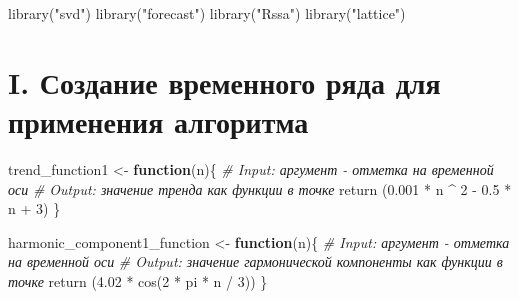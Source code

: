 \documentclass[
]{article}
\author{}
\date{\vspace{-2.5em}}
\newenvironment{Shaded}{\begin{snugshade}}{\end{snugshade}}
\newcommand{\CommentTok}[1]{\textcolor[rgb]{0.56,0.35,0.01}{\textit{#1}}}
\newcommand{\ControlFlowTok}[1]{\textcolor[rgb]{0.13,0.29,0.53}{\textbf{#1}}}
\newcommand{\DecValTok}[1]{\textcolor[rgb]{0.00,0.00,0.81}{#1}}
\newcommand{\FloatTok}[1]{\textcolor[rgb]{0.00,0.00,0.81}{#1}}
\newcommand{\FunctionTok}[1]{\textcolor[rgb]{0.00,0.00,0.00}{#1}}
\newcommand{\NormalTok}[1]{#1}
\newcommand{\OtherTok}[1]{\textcolor[rgb]{0.56,0.35,0.01}{#1}}
\newcommand{\SpecialCharTok}[1]{\textcolor[rgb]{0.00,0.00,0.00}{#1}}
\newcommand{\StringTok}[1]{\textcolor[rgb]{0.31,0.60,0.02}{#1}}
\begin{document}
\begin{Shaded}
\begin{Highlighting}[]
  \FunctionTok{library}\NormalTok{(}\StringTok{"svd"}\NormalTok{)}
  \FunctionTok{library}\NormalTok{(}\StringTok{"forecast"}\NormalTok{)}
  \FunctionTok{library}\NormalTok{(}\StringTok{"Rssa"}\NormalTok{)}
  \FunctionTok{library}\NormalTok{(}\StringTok{"lattice"}\NormalTok{)}
\end{Highlighting}
\end{Shaded}

\hypertarget{i.-ux441ux43eux437ux434ux430ux43dux438ux435-ux432ux440ux435ux43cux435ux43dux43dux43eux433ux43e-ux440ux44fux434ux430-ux434ux43bux44f-ux43fux440ux438ux43cux435ux43dux435ux43dux438ux44f-ux430ux43bux433ux43eux440ux438ux442ux43cux430}{%
\section{I. Создание временного ряда для применения
алгоритма}\label{i.-ux441ux43eux437ux434ux430ux43dux438ux435-ux432ux440ux435ux43cux435ux43dux43dux43eux433ux43e-ux440ux44fux434ux430-ux434ux43bux44f-ux43fux440ux438ux43cux435ux43dux435ux43dux438ux44f-ux430ux43bux433ux43eux440ux438ux442ux43cux430}}

\begin{Shaded}
\begin{Highlighting}[]
\NormalTok{  trend\_function1 }\OtherTok{\textless{}{-}} \ControlFlowTok{function}\NormalTok{(n)\{}
    \CommentTok{\# Input: аргумент {-} отметка на временной оси}
    \CommentTok{\# Output: значение тренда как функции в точке}
    \FunctionTok{return}\NormalTok{ (}\FloatTok{0.001} \SpecialCharTok{*}\NormalTok{ n }\SpecialCharTok{\^{}} \DecValTok{2} \SpecialCharTok{{-}} \FloatTok{0.5} \SpecialCharTok{*}\NormalTok{ n }\SpecialCharTok{+} \DecValTok{3}\NormalTok{)}
\NormalTok{  \}}
\end{Highlighting}
\end{Shaded}

\begin{Shaded}
\begin{Highlighting}[]
\NormalTok{  harmonic\_component1\_function }\OtherTok{\textless{}{-}} \ControlFlowTok{function}\NormalTok{(n)\{}
    \CommentTok{\# Input: аргумент {-} отметка на временной оси}
    \CommentTok{\# Output: значение гармонической компоненты как функции в точке}
    \FunctionTok{return}\NormalTok{ (}\FloatTok{4.02} \SpecialCharTok{*} \FunctionTok{cos}\NormalTok{(}\DecValTok{2} \SpecialCharTok{*}\NormalTok{ pi }\SpecialCharTok{*}\NormalTok{ n }\SpecialCharTok{/} \DecValTok{3}\NormalTok{))}
\NormalTok{  \}}
\end{Highlighting}
\end{Shaded}
\end{document}
